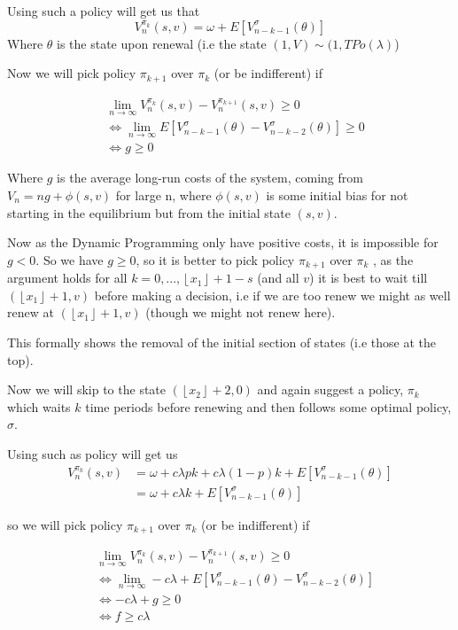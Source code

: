 \documentclass[a4paper,10pt]{article}
\newcommand{\floor}[1]{\left \lfloor #1 \right \rfloor}
\theoremstyle{definition}
\theoremstyle{definition}
\theoremstyle{remark}
\theoremstyle{definition}
\begin{document}
Using such a policy will get us that
\begin{equation}
V_{n}^{\pi_{k}}(s,v)=\omega+E[V_{n-k-1}^{\sigma}(\theta)]
\end{equation}
Where $\theta$ is the state upon renewal (i.e the state $(1,V) \sim (1,TPo(\lambda)$)

Now we will pick policy $\pi_{k+1}$ over $\pi_{k}$ (or be indifferent) if

\begin{align*}
&\lim\limits_{n \rightarrow \infty} V_{n}^{\pi_{k}} (s,v) - V_{n}^{\pi_{k+1}}(s,v) \geq 0 \\
& \iff \lim\limits_{n \rightarrow \infty} E[V_{n-k-1}^{\sigma}(\theta) - V_{n-k-2}^{\sigma} (\theta)] \geq 0 \\
& \iff g \geq 0
\end{align*}

Where $g$ is the average long-run costs of the system, coming from $V_{n}=ng+\phi(s,v)$ for large n, where $\phi(s,v)$ is some initial bias for not starting in the equilibrium but from the initial state $(s,v)$.

Now as the Dynamic Programming only have positive costs, it is impossible for $g < 0$. So we have $g \geq 0 $, so it is better to pick policy $\pi_{k+1}$ over $\pi_{k}$ , as the argument holds for all $k=0,...,\floor{x_{1}}+1-s$ (and all $v$) it is best to wait till $(\floor{x_{1}}+1,v)$ before making a decision, i.e if we are too renew we might as well renew at $(\floor{x_{1}}+1,v)$ (though we might not renew here).

This formally shows the removal of the initial section of states (i.e those at the top).

Now we will skip to the state $(\floor{x_{2}}+2,0)$ and again suggest a policy, $\pi_{k}$ which waits $k$ time periods before renewing and then follows some optimal policy, $\sigma$.

Using such as policy will get us
\begin{align*}
V_{n}^{\pi_{k}}(s,v)&=\omega + c \lambda p  k + c \lambda (1-p) k + E[V_{n-k-1}^{\sigma}(\theta)] \\
&=\omega + c \lambda k + E[V_{n-k-1}^{\sigma}(\theta)] 
\end{align*}

so we will pick policy $\pi_{k+1}$ over $\pi_{k}$ (or be indifferent) if

\begin{align*}
&\lim\limits_{n \rightarrow \infty} V_{n}^{\pi_{k}}(s,v) - V_{n}^{\pi_{k+1}}(s,v) \geq 0 \\
& \iff \lim\limits_{n \rightarrow \infty} -c \lambda + E[V_{n-k-1}^{\sigma}(\theta) - V_{n-k-2}^{\sigma} (\theta)] \\
& \iff -c \lambda + g \geq 0 \\
& \iff f \geq c \lambda
\end{align*}
\end{document}
